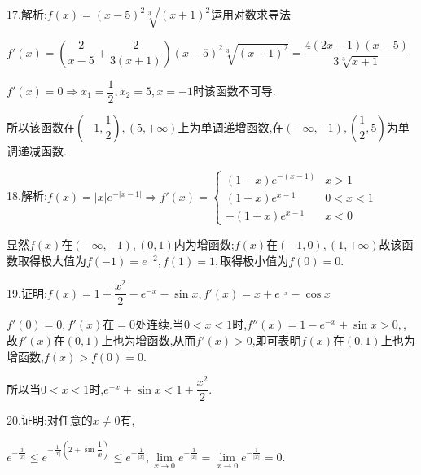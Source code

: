 17.解析:$f\left( x \right) = {\left( {x - 5} \right)^2}\sqrt[3]{{{{\left( {x + 1} \right)}^2}}}$运用对数求导法

$f'\left( x \right) = \left( {\dfrac{2}{{x - 5}} + \dfrac{2}{{3\left( {x + 1} \right)}}} \right){\left( {x - 5} \right)^2}\sqrt[3]{{{{\left( {x + 1} \right)}^2}}} = \dfrac{{4\left( {2x - 1} \right)\left( {x - 5} \right)}}{{3\sqrt[3]{{x + 1}}}}$

$f'\left( x \right) = 0 \Rightarrow {x_1} = \dfrac{1}{2},{x_2} = 5,x =  - 1$时该函数不可导.

所以该函数在$\left( { - 1,\dfrac{1}{2}} \right),\left( {5, + \infty } \right)$上为单调递增函数,在$\left( { - \infty , - 1} \right),\left( {\dfrac{1}{2},5} \right)$为单调递减函数.

18.解析:$f\left( x \right) = \left| x \right|{e^{ - \left| {x - 1} \right|}} \Rightarrow f'\left( x \right) = \left\{ {\begin{array}{*{20}{l}}
{\left( {1 - x} \right){e^{ - \left( {x - 1} \right)}}}&{x > 1}\\
{\left( {1 + x} \right){e^{x - 1}}}&{0 < x < 1}\\
{ - \left( {1 + x} \right){e^{x - 1}}}&{x < 0}
\end{array}} \right.$

显然$f(x)$在$\left( { - \infty , - 1} \right),\left( {0,1} \right)$内为增函数;$f(x)$在$\left( { - 1,0} \right),\left( {1, + \infty } \right)$故该函数取得极大值为$f\left( { - 1} \right) = {e^{ - 2}},f\left( 1 \right) = 1,$取得极小值为$f\left( 0 \right) = 0.$

19.证明:$f\left( x \right) = 1 + \dfrac{{{x^2}}}{2} - {e^{ - x}} - \sin x,f'\left( x \right) = x + {e^{_{ - x}}} - \cos x$

$f'\left( 0 \right) = 0,$$f'\left( x \right)$在$ = 0$处连续.当$0 < x < 1$时,$f''\left( x \right) = 1 - {e^{ - x}} + \sin x > 0,$,故$f'\left( x \right)$在$(0,1)$上也为增函数,从而$f'\left( x \right) > 0$,即可表明$f\left( x \right)$在$(0,1)$上也为增函数,$f\left( x \right) > f\left( 0 \right) = 0$.

所以当$0 < x < 1$时,${e^{ - x}} + \sin x < 1 + \dfrac{{{x^2}}}{2}$.

20.证明:对任意的$x \ne 0$有,

${e^{ - \frac{3}{{\left| x \right|}}}} \le {e^{ - \frac{1}{{\left| x \right|}}\left( {2 + \sin \dfrac{1}{x}} \right)}} \le {e^{ - \frac{1}{{\left| x \right|}}}},\lim\limits_{x \to 0}  {e^{ - \frac{3}{{\left| x \right|}}}} = \lim\limits_{x \to 0}  {e^{ - \frac{1}{{\left| x \right|}}}} = 0.$

